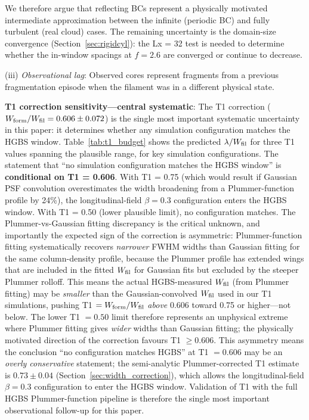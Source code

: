 \documentclass[twoside,twocolumn]{mnras}
\begin{document}
We therefore argue that reflecting BCs represent a physically motivated intermediate
approximation between the infinite (periodic BC) and fully turbulent (real cloud) cases.
The remaining uncertainty is the domain-size convergence (Section~\ref{sec:rigidcyl}):
the Lx = 32 test is needed to determine whether the in-window spacings at $f = 2.6$
are converged or continue to decrease.

(iii) \textit{Observational lag}: Observed cores represent fragments from a previous
fragmentation episode when the filament was in a different physical state.

\textbf{T1 correction sensitivity---central systematic}: The T1 correction
($W_{\rm form}/W_{\rm fil} = 0.606 \pm 0.072$) is the single most important systematic
uncertainty in this paper: it determines whether any simulation configuration matches
the HGBS window. Table~\ref{tab:t1_budget} shows the predicted $\lambda/W_{\rm fil}$
for three T1 values spanning the plausible range, for key simulation configurations.
The statement that ``no simulation configuration matches the HGBS window'' is
\textbf{conditional on T1 = 0.606}. With T1 = 0.75 (which would result if Gaussian
PSF convolution overestimates the width broadening from a Plummer-function profile by
24\%), the longitudinal-field $\beta = 0.3$ configuration enters the HGBS window.
With T1 = 0.50 (lower plausible limit), no configuration matches. The Plummer-vs-Gaussian fitting discrepancy is the critical unknown, and importantly the expected sign of the correction is asymmetric: Plummer-function fitting systematically recovers \textit{narrower} FWHM widths than Gaussian fitting for the same column-density profile, because the Plummer profile has extended wings that are included in the fitted $W_{\rm fil}$ for Gaussian fits but excluded by the steeper Plummer rolloff. This means the actual HGBS-measured $W_{\rm fil}$ (from Plummer fitting) may be \textit{smaller} than the Gaussian-convolved $W_{\rm fil}$ used in our T1 simulations, pushing T1 $= W_{\rm form}/W_{\rm fil}$ \textit{above} 0.606 toward 0.75 or higher---not below. The lower T1 $= 0.50$ limit therefore represents an unphysical extreme where Plummer fitting gives \textit{wider} widths than Gaussian fitting; the physically motivated direction of the correction favours T1 $\geq 0.606$. This asymmetry means the conclusion ``no configuration matches HGBS'' at T1 $= 0.606$ may be an \textit{overly conservative} statement; the semi-analytic Plummer-corrected T1 estimate is $0.73 \pm 0.04$ (Section~\ref{sec:width_correction}), which allows the longitudinal-field $\beta = 0.3$ configuration to enter the HGBS window. Validation of T1 with the full HGBS Plummer-function pipeline is therefore the single most important observational follow-up for this paper.
\end{document}
